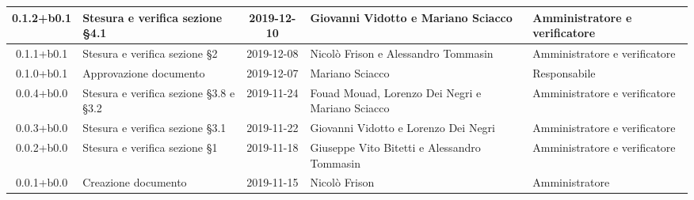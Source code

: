 \begin{center}
\begin{longtable}{|c|p{3.5cm}|c|p{3cm}|p{3cm}|}
	0.1.2+b0.1 & Stesura e verifica sezione \S4.1 & 2019-12-10 & Giovanni Vidotto e Mariano Sciacco & Amministratore e verificatore \\
	\hline
	0.1.1+b0.1 & Stesura e verifica sezione \S2  & 2019-12-08 & Nicolò Frison e Alessandro Tommasin & Amministratore e verificatore \\
	\hline
	0.1.0+b0.1 & Approvazione documento & 2019-12-07 & Mariano Sciacco & Responsabile \\
	\hline
	0.0.4+b0.0 & Stesura e verifica sezione \S3.8 e \S3.2 & 2019-11-24 & Fouad Mouad, Lorenzo Dei Negri e Mariano Sciacco & Amministratore e verificatore \\
	\hline
	0.0.3+b0.0 & Stesura e verifica sezione \S3.1 & 2019-11-22 & Giovanni Vidotto e Lorenzo Dei Negri & Amministratore e verificatore \\
	\hline
	0.0.2+b0.0 & Stesura e verifica sezione \S1 & 2019-11-18 & Giuseppe Vito Bitetti e Alessandro Tommasin & Amministratore e verificatore \\
	\hline
	0.0.1+b0.0 & Creazione documento & 2019-11-15 & Nicolò Frison & Amministratore  \\
	\hline

	\end{longtable}
\end{center}
